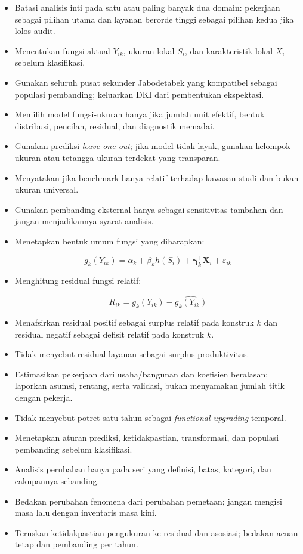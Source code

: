 \documentclass[
  indonesian,
  11pt,
]{article}
\begin{document}
\begin{itemize}
\item[$\square$]
  Batasi analisis inti pada satu atau paling banyak dua domain:
  pekerjaan sebagai pilihan utama dan layanan berorde tinggi sebagai
  pilihan kedua jika lolos audit.
\item[$\square$]
  Menentukan fungsi aktual \(Y_{ik}\), ukuran lokal \(S_i\), dan
  karakteristik lokal \(X_i\) sebelum klasifikasi.
\item[$\square$]
  Gunakan seluruh pusat sekunder Jabodetabek yang kompatibel sebagai
  populasi pembanding; keluarkan DKI dari pembentukan ekspektasi.
\item[$\square$]
  Memilih model fungsi-ukuran hanya jika jumlah unit efektif, bentuk
  distribusi, pencilan, residual, dan diagnostik memadai.
\item[$\square$]
  Gunakan prediksi \emph{leave-one-out}; jika model tidak layak, gunakan
  kelompok ukuran atau tetangga ukuran terdekat yang transparan.
\item[$\square$]
  Menyatakan jika benchmark hanya relatif terhadap kawasan studi dan
  bukan ukuran universal.
\item[$\square$]
  Gunakan pembanding eksternal hanya sebagai sensitivitas tambahan dan
  jangan menjadikannya syarat analisis.
\item[$\square$]
  Menetapkan bentuk umum fungsi yang diharapkan:

  \[
  g_k(Y_{ik}) = \alpha_k + \beta_k h(S_i) + \boldsymbol{\gamma}_k^{\mathsf T}\mathbf{X}_i + \varepsilon_{ik}
  \]
\item[$\square$]
  Menghitung residual fungsi relatif:

  \[
  R_{ik}=g_k(Y_{ik})-\widehat{g_k(Y_{ik})}
  \]
\item[$\square$]
  Menafsirkan residual positif sebagai surplus relatif pada konstruk
  \(k\) dan residual negatif sebagai defisit relatif pada konstruk
  \(k\).
\item[$\square$]
  Tidak menyebut residual layanan sebagai surplus produktivitas.
\item[$\square$]
  Estimasikan pekerjaan dari usaha/bangunan dan koefisien beralasan;
  laporkan asumsi, rentang, serta validasi, bukan menyamakan jumlah
  titik dengan pekerja.
\item[$\square$]
  Tidak menyebut potret satu tahun sebagai \emph{functional upgrading}
  temporal.
\item[$\square$]
  Menetapkan aturan prediksi, ketidakpastian, transformasi, dan populasi
  pembanding sebelum klasifikasi.
\item[$\square$]
  Analisis perubahan hanya pada seri yang definisi, batas, kategori, dan
  cakupannya sebanding.
\item[$\square$]
  Bedakan perubahan fenomena dari perubahan pemetaan; jangan mengisi
  masa lalu dengan inventaris masa kini.
\item[$\square$]
  Teruskan ketidakpastian pengukuran ke residual dan asosiasi; bedakan
  acuan tetap dan pembanding per tahun.
\end{itemize}
\end{document}

